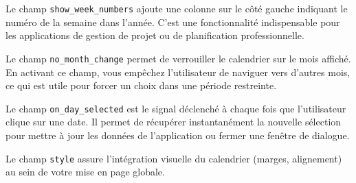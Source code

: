 Le champ \texttt{show\_week\_numbers} ajoute une colonne sur le côté gauche indiquant le numéro de la semaine dans l'année. C'est une fonctionnalité indispensable pour les applications de gestion de projet ou de planification professionnelle.

Le champ \texttt{no\_month\_change} permet de verrouiller le calendrier sur le mois affiché. En activant ce champ, vous empêchez l'utilisateur de naviguer vers d'autres mois, ce qui est utile pour forcer un choix dans une période restreinte.

Le champ \texttt{on\_day\_selected} est le signal déclenché à chaque fois que l'utilisateur clique sur une date. Il permet de récupérer instantanément la nouvelle sélection pour mettre à jour les données de l'application ou fermer une fenêtre de dialogue.

Le champ \texttt{style} assure l'intégration visuelle du calendrier (marges, alignement) au sein de votre mise en page globale.